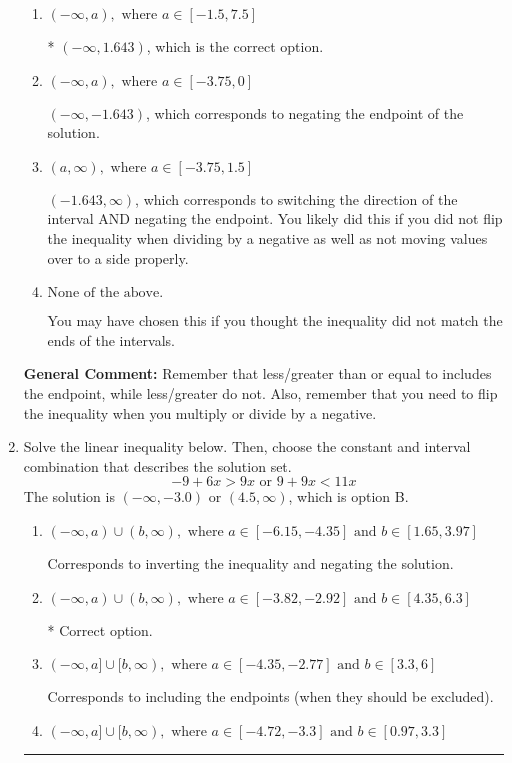 \documentclass{extbook}[14pt]
\newcommand{\litem}[1]{\item #1

\rule{\textwidth}{0.4pt}}
\begin{document}
\begin{enumerate}
{\begin{enumerate}[label=\Alph*.]
 $(1.643, \infty)$, which corresponds to switching the direction of the interval. You likely did this if you did not flip the inequality when dividing by a negative!
\item \( (-\infty, a), \text{ where } a \in [-1.5, 7.5] \)

* $(-\infty, 1.643)$, which is the correct option.
\item \( (-\infty, a), \text{ where } a \in [-3.75, 0] \)

 $(-\infty, -1.643)$, which corresponds to negating the endpoint of the solution.
\item \( (a, \infty), \text{ where } a \in [-3.75, 1.5] \)

 $(-1.643, \infty)$, which corresponds to switching the direction of the interval AND negating the endpoint. You likely did this if you did not flip the inequality when dividing by a negative as well as not moving values over to a side properly.
\item \( \text{None of the above}. \)

You may have chosen this if you thought the inequality did not match the ends of the intervals.
\end{enumerate}

\textbf{General Comment:} Remember that less/greater than or equal to includes the endpoint, while less/greater do not. Also, remember that you need to flip the inequality when you multiply or divide by a negative.
}
\litem{
Solve the linear inequality below. Then, choose the constant and interval combination that describes the solution set.
\[ -9 + 6 x > 9 x \text{ or } 9 + 9 x < 11 x \]The solution is \( (-\infty, -3.0) \text{ or } (4.5, \infty) \), which is option B.\begin{enumerate}[label=\Alph*.]
\item \( (-\infty, a) \cup (b, \infty), \text{ where } a \in [-6.15, -4.35] \text{ and } b \in [1.65, 3.97] \)

Corresponds to inverting the inequality and negating the solution.
\item \( (-\infty, a) \cup (b, \infty), \text{ where } a \in [-3.82, -2.92] \text{ and } b \in [4.35, 6.3] \)

 * Correct option.
\item \( (-\infty, a] \cup [b, \infty), \text{ where } a \in [-4.35, -2.77] \text{ and } b \in [3.3, 6] \)

Corresponds to including the endpoints (when they should be excluded).
\item \( (-\infty, a] \cup [b, \infty), \text{ where } a \in [-4.72, -3.3] \text{ and } b \in [0.97, 3.3] \)


\end{enumerate}}
\end{enumerate}
\end{document}
